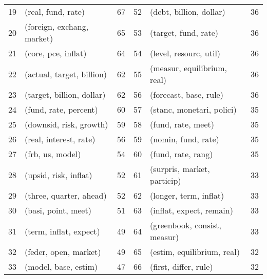 \begin{tabular}{rlrrlr}
 19 &          (real, fund, rate) &     67 &  52 &       (debt, billion, dollar) &     36 \\
 20 &  (foreign, exchang, market) &     65 &  53 &          (target, fund, rate) &     36 \\
 21 &         (core, pce, inflat) &     64 &  54 &        (level, resourc, util) &     36 \\
 22 &   (actual, target, billion) &     62 &  55 &   (measur, equilibrium, real) &     36 \\
 23 &   (target, billion, dollar) &     62 &  56 &        (forecast, base, rule) &     36 \\
 24 &       (fund, rate, percent) &     60 &  57 &     (stanc, monetari, polici) &     35 \\
 25 &     (downsid, risk, growth) &     59 &  58 &            (fund, rate, meet) &     35 \\
 26 &      (real, interest, rate) &     56 &  59 &           (nomin, fund, rate) &     35 \\
 27 &            (frb, us, model) &     54 &  60 &            (fund, rate, rang) &     35 \\
 28 &       (upsid, risk, inflat) &     52 &  61 &   (surpris, market, particip) &     33 \\
 29 &     (three, quarter, ahead) &     52 &  62 &        (longer, term, inflat) &     33 \\
 30 &         (basi, point, meet) &     51 &  63 &      (inflat, expect, remain) &     33 \\
 31 &      (term, inflat, expect) &     49 &  64 &  (greenbook, consist, measur) &     33 \\
 32 &       (feder, open, market) &     49 &  65 &    (estim, equilibrium, real) &     32 \\
 33 &        (model, base, estim) &     47 &  66 &         (first, differ, rule) &     32 \\
\bottomrule
\end{tabular}
